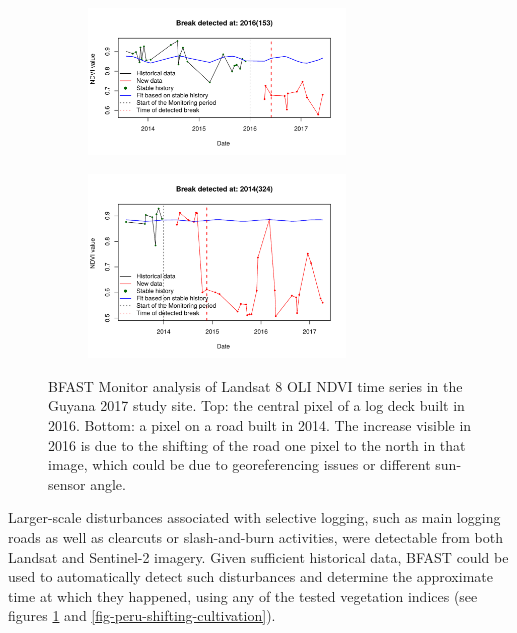 \documentclass[a4paper,12pt]{scrbook}
\begin{document}
\begin{figure}
  \begin{subfigure}{\textwidth}
    \centering
    \includegraphics[width=0.75\textwidth]{thesis-figures/11-guyana17-landsat-ndvi-deck-b}
  \end{subfigure}
  \begin{subfigure}{\textwidth}
    \centering
    \includegraphics[width=0.75\textwidth]{thesis-figures/12-guyana17-landsat-ndvi-road-b}
  \end{subfigure}
  \caption{\ac{BFAST} Monitor analysis of Landsat 8 \ac{OLI} \ac{NDVI} time series in the Guyana 2017 study site. Top: the central pixel of a log deck built in 2016. Bottom: a pixel on a road built in 2014. The increase visible in 2016 is due to the shifting of the road one pixel to the north in that image, which could be due to georeferencing issues or different sun-sensor angle.}
  \label{fig-guyana17-landsat-ndvi-deck}
\end{figure}

Larger-scale disturbances associated with selective logging, such as main logging roads as well as clearcuts or slash-and-burn activities, were detectable from both Landsat and Sentinel-2 imagery. Given sufficient historical data, \ac{BFAST} could be used to automatically detect such disturbances and determine the approximate time at which they happened, using any of the tested vegetation indices (see figures \ref{fig-guyana17-landsat-ndvi-deck} and \ref{fig-peru-shifting-cultivation}).
\end{document}
